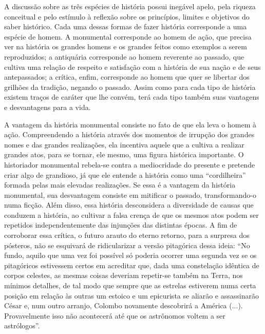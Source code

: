 A discussão sobre as três espécies de história possui inegável apelo,
pela riqueza conceitual e pelo estímulo à reflexão sobre os princípios,
limites e objetivos do saber histórico. Cada uma dessas formas de fazer
história corresponde a uma espécie de homem. A monumental corresponde ao
homem de ação, que precisa ver na história os grandes homens e os
grandes feitos como exemplos a serem reproduzidos; a antiquária
corresponde ao homem reverente ao passado, que cultiva uma relação de
respeito e satisfação com a história de sua nação e de seus
antepassados; a crítica, enfim, corresponde ao homem que quer se
libertar dos grilhões da tradição, negando o passado. Assim como para
cada tipo de história existem traços de caráter que lhe convém, terá cada tipo
também suas vantagens e desvantagens para a vida.

A vantagem da história monumental consiste no fato de que ela leva o
homem à ação. Compreendendo a história através dos momentos de irrupção
dos grandes nomes e das grandes realizações, ela incentiva aquele que a
cultiva a realizar grandes atos, para se tornar, ele mesmo, uma figura
histórica importante. O historiador monumental rebela-se contra a
mediocridade do presente e pretende criar algo de grandioso, já que ele
entende a história como uma ``cordilheira'' formada pelas mais elevadas
realizações. Se essa é a vantagem da história monumental, sua
desvantagem consiste em mitificar o passado, transformando-o numa
ficção. Além disso, essa história desconsidera a diversidade de causas
que conduzem a história, ao cultivar a falsa crença de que os mesmos
atos podem ser repetidos independentemente das injunções das distintas
épocas. A fim de corroborar essa crítica, o futuro arauto do eterno
retorno, para a surpresa dos pósteros, não se esquivará de ridicularizar
a versão pitagórica dessa ideia: ``No fundo, aquilo que uma vez foi
possível só poderia ocorrer uma segunda vez se os pitagóricos estivessem
certos em acreditar que, dada uma constelação idêntica de corpos
celestes, as mesmas coisas deveriam repetir-se também na Terra, nos
mínimos detalhes, de tal modo que sempre que as estrelas estiverem numa
certa posição em relação às outras um estoico e um epicurista se aliarão
e assassinarão César e, num outro arranjo, Colombo novamente descobrirá
a América (...). Provavelmente isso não acontecerá até que os astrônomos
voltem a ser astrólogos''.

